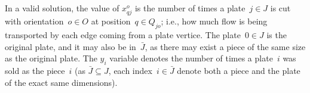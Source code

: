 \documentclass[ppgc,tese,english,formais,babel]{iiufrgs}
\makeatletter
\newcommand{\specialcell}[1]{\ifmeasuring@#1\else\omit$\displaystyle#1$\ignorespaces\fi}
\makeatother
\begin{document}
In a valid solution, the value of \(x^o_{qj}\) is the number of times a plate~\(j \in J\) is cut with orientation~\(o \in O\) at position~\(q \in Q_{jo}\); i.e., how much flow is being transported by each edge coming from a plate vertice.
The plate~\(0 \in J\) is the original plate, and it may also be in~\(\bar{J}\), as there may exist a piece of the same size as the original plate.
The \(y_i\) variable denotes the number of times a plate~\(i\) was sold as the piece~\(i\) (as \(\bar{J} \subseteq J\), each index~\(i \in \bar{J}\) denote both a piece and the plate of the exact same dimensions).

\end{document}
